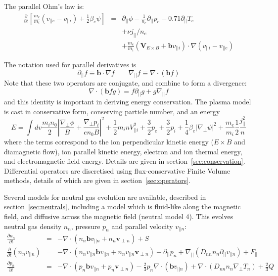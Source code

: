 \documentclass[12pt,a4paper]{article}
\begin{document}
The parallel Ohm's law is:
\begin{subequations}
  \begin{eqnarray}
    \frac{\partial}{\partial t}\left[\frac{m_e}{m_i}\left(v_{||e}-v_{||i}\right) + \frac{1}{2}\beta_e\psi\right] &=&  \partial_{||}\phi - \frac{1}{n_e}\partial_{||} p_e - 0.71\partial_{||} T_e \\
    && + \nu j_{||}/n_e \\
    &&+ \frac{m_e}{m_i}\left(\mathbf{V}_{E\times B} + \mathbf{b}v_{||i}\right)\cdot\nabla\left(v_{||i} - v_{||e}\right) \label{eq:hotion_ohm}
  \end{eqnarray}
\end{subequations}


The notation used for parallel derivatives is
\begin{equation}
  \partial_{||} f \equiv \mathbf{b}\cdot\nabla f \qquad \nabla_{||} f \equiv \nabla\cdot\left(\mathbf{b} f\right)
\end{equation}
Note that these two operators are conjugate, and combine to form a divergence:
\[
\nabla\cdot\left(\mathbf{b}fg\right) = f\partial_{||} g + g \nabla_{||} f
\]
and this identity is important in deriving energy conservation.
The plasma model is cast in conservative form, conserving particle number, and an energy
\begin{equation}
E = \int dv \frac{m_in_0}{2}\left|\frac{\nabla_\perp\phi}{B} + \frac{\nabla_\perp p_i}{en_0B}\right|^2 + \frac{1}{2}m_inV_{||i}^2 + \frac{3}{2}p_e + \frac{3}{2}p_i + \frac{1}{4}\beta_e\left|\nabla_\perp\psi\right|^2 + \frac{m_e}{m_i}\frac{1}{2}\frac{j_{||}^2}{n}
\end{equation}
where the terms correspond to the ion perpendicular kinetic energy ($E\times B$ and diamagnetic flow), ion parallel kinetic energy, electron and ion thermal energy, and electromagnetic field energy. Details are given in section~\ref{sec:conservation}. Differential operators are discretised using flux-conservative Finite Volume methods, details of which are given in section~\ref{sec:operators}. 

Several models for neutral gas evolution are available, described in section~\ref{sec:neutrals}, including a model which is fluid-like along the magnetic field, and diffusive across the magnetic field (neutral model 4). This evolves neutral gas density $n_n$, pressure $p_n$ and parallel velocity $v_{||n}$:
\begin{eqnarray}
  \frac{\partial n_n}{\partial t} &=& -\nabla\cdot\left(n_n\mathbf{b}v_{||n} + n_n\mathbf{v}_{\perp n}\right) + S\\
  \frac{\partial}{\partial t}\left(n_nv_{||n}\right) &=& -\nabla\cdot\left(n_nv_{||n} \mathbf{b}v_{||n} + n_nv_{||n}\mathbf{v}_{\perp n}\right) - \partial_{||}p_n + \nabla_{||}\left(D_{nn}n_n\partial_{||}v_{||n}\right) + F_{||} \\
  \frac{\partial p_n}{\partial t} &=& -\nabla\cdot\left(p_n\mathbf{b}v_{||n} + p_n\mathbf{v}_{\perp n}\right) - \frac{2}{3}p_n\nabla\cdot\left(\mathbf{b}v_{||n}\right) + \nabla\cdot\left(D_{nn}n_n\nabla_\perp T_n\right) + \frac{2}{3}Q
\end{eqnarray}
\end{document}
